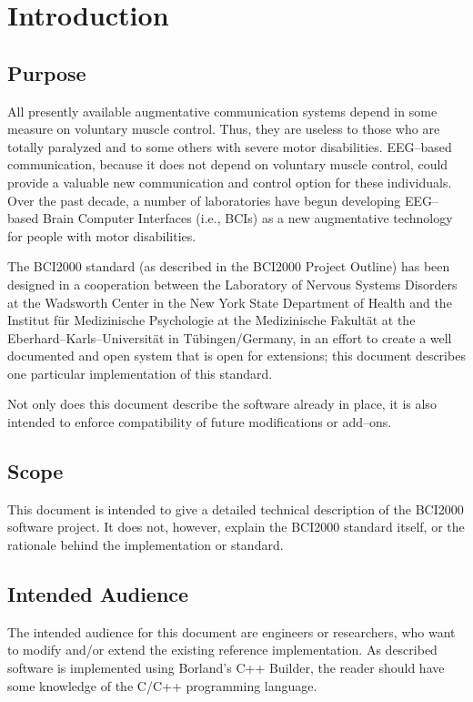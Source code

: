 \chapter{Introduction}

\section{Purpose}

All presently available augmentative communication systems depend in some 
measure on voluntary muscle control.  Thus, they are useless to those who are 
totally paralyzed and to some others with severe motor disabilities.  EEG--based 
communication, because it does not depend on voluntary muscle control, could 
provide a valuable new communication and control option for these individuals.  
Over the past decade, a number of laboratories have begun developing EEG--based 
Brain Computer Interfaces (i.e., BCIs) as a new augmentative technology for 
people with motor disabilities.

The BCI2000 standard (as described in the BCI2000 Project Outline) has been 
designed in a cooperation between the Laboratory of Nervous Systems Disorders at 
the Wadsworth Center in the New York State Department of Health and the Institut 
f\"ur Medizinische Psychologie at the Medizinische Fakult\"at at the 
Eberhard--Karls--Universit\"at in T\"ubingen/Germany, in an effort to create a 
well documented and open system that is open for extensions; this document 
describes one particular implementation of this standard.

Not only does this document describe the software already in place, it is also 
intended to enforce compatibility of future modifications or add--ons.

\section{Scope}

This document is intended to give a detailed technical description of the 
BCI2000 software project. It does not, however, explain the BCI2000 standard 
itself, or the rationale behind the implementation or standard.

\section{Intended Audience}

The intended audience for this document are engineers or researchers, who want 
to modify and/or extend the existing reference implementation. As described 
software is implemented using Borland's C++ Builder, the reader should have some 
knowledge of the C/C++ programming language.

